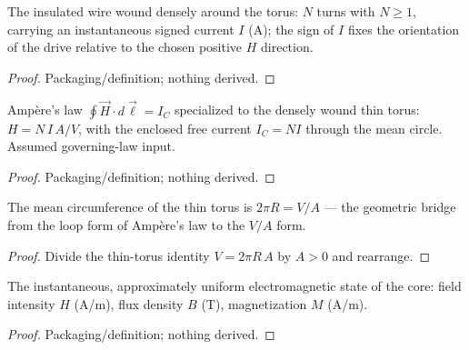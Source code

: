 \begin{definition}
\label{def:IPhO2026Problems_problem_IPhO_2026_3_A_3:PmTWinding}
The insulated wire wound densely around the torus: $N$ turns with $N \ge 1$,
carrying an instantaneous signed current $I$ (A); the sign of $I$ fixes the
orientation of the drive relative to the chosen positive $H$ direction.
\end{definition}
\begin{proof}
Packaging/definition; nothing derived.
\end{proof}

\begin{definition}
\label{def:IPhO2026Problems_problem_IPhO_2026_3_A_3:AmpereLawTorus}
Ampère's law $\oint \vec{H}\cdot d\vec{\ell} = I_C$ specialized to the
densely wound thin torus: $H = N\,I\,A / V$, with the enclosed free current
$I_C = N I$ through the mean circle. Assumed governing-law input.
\end{definition}
\begin{proof}
Packaging/definition; nothing derived.
\end{proof}

\begin{lemma}
\label{lem:IPhO2026Problems_problem_IPhO_2026_3_A_3:meanCircumference_eq}
The mean circumference of the thin torus is $2\pi R = V/A$ — the geometric
bridge from the loop form of Ampère's law to the $V/A$ form.
\end{lemma}
\begin{proof}
Divide the thin-torus identity $V = 2\pi R\,A$ by $A > 0$ and rearrange.
\end{proof}

\begin{definition}
\label{def:IPhO2026Problems_problem_IPhO_2026_3_A_3:PmTFieldState}
The instantaneous, approximately uniform electromagnetic state of the core:
field intensity $H$ (A/m), flux density $B$ (T), magnetization $M$ (A/m).
\end{definition}
\begin{proof}
Packaging/definition; nothing derived.
\end{proof}

